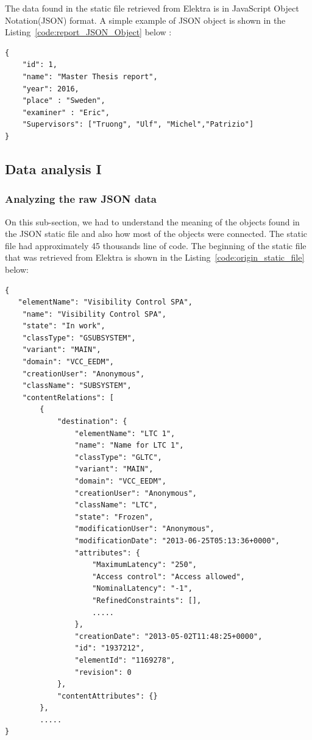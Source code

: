 The data found in the static file retrieved from Elektra is in JavaScript Object Notation(JSON) format. A simple example of JSON object is shown in the  Listing~\ref{code:report_JSON_Object} below :

\begin{lstlisting}[caption=An example of JSON object, label=code:report_JSON_Object]
{
    "id": 1,
    "name": "Master Thesis report",
    "year": 2016,
    "place" : "Sweden",
    "examiner" : "Eric",
    "Supervisors": ["Truong", "Ulf", "Michel","Patrizio"]
}
\end{lstlisting}

\subsection{Data analysis I}

\subsubsection{Analyzing the raw JSON data}

On this sub-section, we had to understand the meaning of the objects found in the JSON static file and also how most of the objects were connected. The static file had approximately 45 thousands line of code. The beginning of the static file that was retrieved from Elektra is shown in the Listing~\ref{code:origin_static_file} below:

\begin{lstlisting}[caption=A small part of how the original file appear, label=code:origin_static_file]
{
   "elementName": "Visibility Control SPA", 
    "name": "Visibility Control SPA", 
    "state": "In work", 
    "classType": "GSUBSYSTEM", 
    "variant": "MAIN", 
    "domain": "VCC_EEDM", 
    "creationUser": "Anonymous", 
    "className": "SUBSYSTEM", 
    "contentRelations": [
        {
            "destination": {
                "elementName": "LTC 1", 
                "name": "Name for LTC 1", 
                "classType": "GLTC", 
                "variant": "MAIN", 
                "domain": "VCC_EEDM", 
                "creationUser": "Anonymous", 
                "className": "LTC", 
                "state": "Frozen", 
                "modificationUser": "Anonymous", 
                "modificationDate": "2013-06-25T05:13:36+0000", 
                "attributes": {
                    "MaximumLatency": "250", 
                    "Access control": "Access allowed", 
                    "NominalLatency": "-1", 
                    "RefinedConstraints": [], 
                    .....
                }, 
                "creationDate": "2013-05-02T11:48:25+0000", 
                "id": "1937212", 
                "elementId": "1169278", 
                "revision": 0
            }, 
            "contentAttributes": {}
        }, 
        .....   
}
\end{lstlisting}


